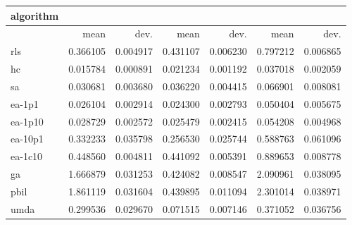 \begin{tabular}{@{}l*{6}{>{{}}N{1}{2}}@{}}
\toprule
{algorithm} &  &  &  \\
\midrule
& {mean} & {dev.} & {mean} & {dev.} & {mean} & {dev.} \\
\midrule
rls & 0.366105 & 0.004917 & 0.431107 & 0.006230 & 0.797212 & 0.006865 \\
 hc & 0.015784 & 0.000891 & 0.021234 & 0.001192 & 0.037018 & 0.002059 \\
 sa & 0.030681 & 0.003680 & 0.036220 & 0.004415 & 0.066901 & 0.008081 \\
 ea-1p1 & 0.026104 & 0.002914 & 0.024300 & 0.002793 & 0.050404 & 0.005675 \\
 ea-1p10 & 0.028729 & 0.002572 & 0.025479 & 0.002415 & 0.054208 & 0.004968 \\
 ea-10p1 & 0.332233 & 0.035798 & 0.256530 & 0.025744 & 0.588763 & 0.061096 \\
 ea-1c10 & 0.448560 & 0.004811 & 0.441092 & 0.005391 & 0.889653 & 0.008778 \\
 ga & 1.666879 & 0.031253 & 0.424082 & 0.008547 & 2.090961 & 0.038095 \\
 pbil & 1.861119 & 0.031604 & 0.439895 & 0.011094 & 2.301014 & 0.038971 \\
 umda & 0.299536 & 0.029670 & 0.071515 & 0.007146 & 0.371052 & 0.036756 \\
 \bottomrule
\end{tabular}
